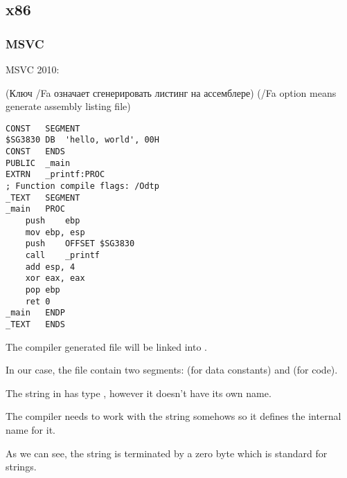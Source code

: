 ﻿\subsection{x86}

\subsubsection{MSVC}

 MSVC 2010: 

\IFRU
{(Ключ /Fa означает сгенерировать листинг на ассемблере)}
{(/Fa option means generate assembly listing file)}

\begin{lstlisting}[caption=MSVC 2010]
CONST	SEGMENT
$SG3830	DB	'hello, world', 00H
CONST	ENDS
PUBLIC	_main
EXTRN	_printf:PROC
; Function compile flags: /Odtp
_TEXT	SEGMENT
_main	PROC
	push	ebp
	mov	ebp, esp
	push	OFFSET $SG3830
	call	_printf
	add	esp, 4
	xor	eax, eax
	pop	ebp
	ret	0
_main	ENDP
_TEXT	ENDS
\end{lstlisting}


{The compiler generated  file will be linked into .}

{In our case, the file contain two segments:  (for data constants) and  (for code).} 

{The string  in \CCpp has type , however it doesn't have
its own name.}

{The compiler needs to work with the string somehows so it defines the internal name  for it.}

{As we can see, the string is terminated by a zero byte which is standard for \CCpp strings.}

